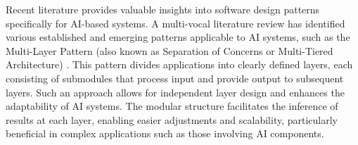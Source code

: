 Recent literature provides valuable insights into software design patterns specifically for AI-based systems. A multi-vocal literature review has identified various established and emerging patterns applicable to AI systems, such as the Multi-Layer Pattern (also known as Separation of Concerns or Multi-Tiered Architecture) \cite{heiland2023design}. This pattern divides applications into clearly defined layers, each consisting of submodules that process input and provide output to subsequent layers. Such an approach allows for independent layer design and enhances the adaptability of AI systems. The modular structure facilitates the inference of results at each layer, enabling easier adjustments and scalability, particularly beneficial in complex applications such as those involving AI components. 
